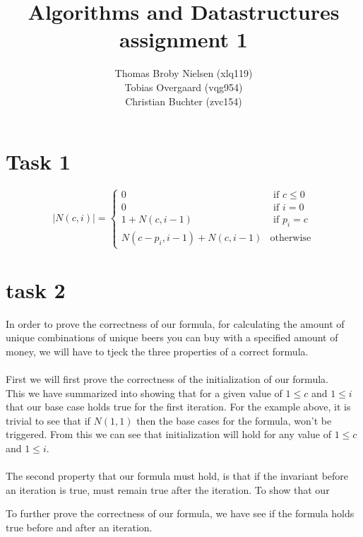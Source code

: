 \documentclass[12pt]{article}
\title{Algorithms and Datastructures assignment 1}
\author{Thomas Broby Nielsen (xlq119)\\ Tobias Overgaard (vqg954)\\ Christian Buchter (zvc154)}
\begin{document}
\maketitle

\tableofcontents

\pagebreak
\section{Task 1}
$$
|N(c,i)| = \left\{ \begin{array}{rl}
0 &\mbox{ if $c \leq 0$} \\
0 &\mbox{ if $i=0$} \\
1+N(c,i-1) &\mbox{ if $p_i=c$}\\
N(c-p_i,i-1)+N(c,i-1) &\mbox{otherwise}
\end{array} \right.
$$

\section{task 2}
In order to prove the correctness of our formula, for calculating the amount of unique combinations of unique beers you can buy with a specified amount of money, we will have to tjeck the three properties of a correct formula.
 \\ \\
First we will first prove the correctness of the initialization of our formula.
\\
This we have summarized into showing that for a given value of $1 \leq c$ and $1 \leq i$ that our base case holds true for the first iteration.
For the example above, it is trivial to see that if $N(1,1)$ then the base cases for the formula, won't be triggered. From this we can see that initialization will hold for any value of $1 \leq c$ and $1 \leq i$.
\\  \\
The second property that our formula must hold, is that if the invariant before an iteration is true, must remain true after the iteration. To show that our 

To further prove the correctness of our formula, we have see if the formula holds true before and after an iteration. 

\newpage
\end{document}
